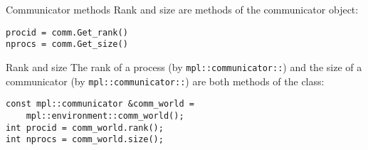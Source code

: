 \begin{pythonnote}{Communicator methods}
Rank and size are methods of the communicator object:
\begin{lstlisting}
procid = comm.Get_rank()
nprocs = comm.Get_size()
\end{lstlisting}
\end{pythonnote}

\begin{mplnote}{Rank and size}
  The rank of a process (by \lstinline+mpl::communicator::+) and
  the size of a communicator (by \lstinline+mpl::communicator::+)
  are both methods of the  class:
\begin{lstlisting}
const mpl::communicator &comm_world =
    mpl::environment::comm_world();
int procid = comm_world.rank();
int nprocs = comm_world.size();
\end{lstlisting}
\end{mplnote}
